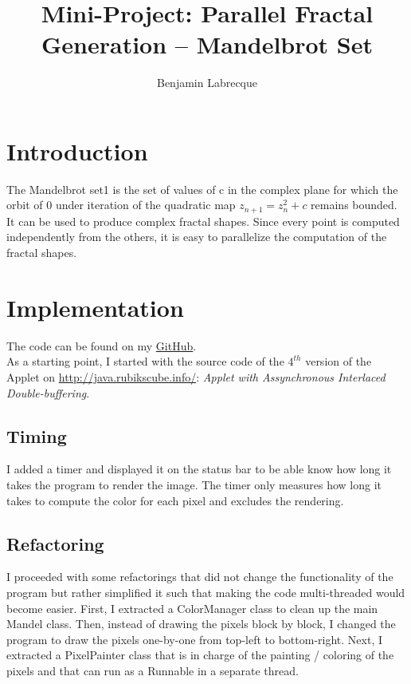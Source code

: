 \documentclass{article}
\title{Mini-Project: Parallel Fractal Generation -- Mandelbrot Set}
\author{Benjamin Labrecque}
\begin{document}
\maketitle

\section{Introduction}

The Mandelbrot set1 is the set of values of c in the complex plane for which the orbit of 0 under 
iteration of the quadratic map $z_{n+1} = z_n^2+c$ remains bounded. 
It can be used to produce complex fractal shapes. Since every point is 
computed independently from the others, it is easy to parallelize the computation of the 
fractal shapes. 

\section{Implementation}

The code can be found on my \href{https://github.com/Benji19967/unine_concurrency/tree/master/src/main/java/concurrency/mandel}{GitHub}. \\

As a starting point, I started with the source code of the $4^{th}$ version of the 
Applet on \href{https://web.archive.org/web/20230929031131/http:/java.rubikscube.info/}{http://java.rubikscube.info/}:
\textit{Applet with Assynchronous Interlaced Double-buffering}.

\subsection{Timing}

I added a timer and displayed it on the status bar to be able know how long it 
takes the program to render the image. The timer only measures how long it takes
to compute the color for each pixel and excludes the rendering.

\subsection{Refactoring}

I proceeded with some refactorings that did not change the functionality of the 
program but rather simplified it such that making the code multi-threaded would become easier.
First, I extracted a ColorManager class to clean up the main Mandel class. Then, instead of 
drawing the pixels block by block, I changed the program to draw the pixels one-by-one from 
top-left to bottom-right. Next, I extracted a PixelPainter class that is in charge of the 
painting / coloring of the pixels and that can run as a Runnable in a separate thread.
\end{document}
